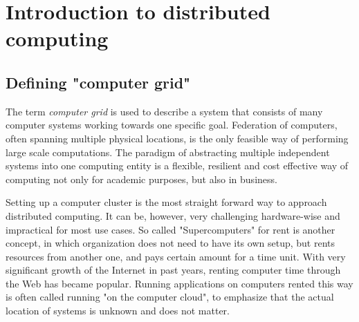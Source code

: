 \chapter{Introduction to distributed computing}

\section{Defining "computer grid"}

\begin{comment}

roadmap:
https://workflowy.com/shared/a2a23b89-e51f-4f48-4fb9-dd4d9194998f/

wprowadzenie

paradigm shift: kiedyś komputery jako wielkie systemy bez interaktywnego dostępu, wykonywanie zadan, długi czas oczekiwania na zadanie
później rewolucja "personal computers", (xerox, apple, ibm, ibm compatible) - interaktywny dostęp, każdy mógł wykonywać swoje obliczenia
teraz obserwujemy kolejną rewolucję (? czy nie nadzbyt dalekoidące wnisoki?) - computer grids, cloud computing, volunteer computing, microsoft xbox one cloud computing for games

co to jest grid, co to jest cloud, co to jest volunteer computing

przykłady już tutaj czy dalej?

"Na jej podstawie została stworzona siec Arpanet, z której wyewoluował ´
Internet, globalna siec komputerowa. Jej powstanie stworzyło nowe mo ´ zliwo ˙ sci ´
przesyłania danych do komputerów, do których uzytkownik nie ma bezpo ˙ srednie- ´
go dost˛epu. Wczesniej przetwarzanie danych było zamkni˛ete w obr˛ebie jedn ´ ego
osrodka."

\end{comment}

The term \emph{computer grid} is used to describe a system that consists of many computer systems working towards one specific goal. Federation of computers, often spanning multiple physical locations, is the only feasible way of performing large scale computations. The paradigm of abstracting multiple independent systems into one computing entity is a flexible, resilient and cost effective way of computing not only for academic purposes, but also in business.

Setting up a computer cluster is the most straight forward way to approach distributed computing. It can be, however, very challenging hardware-wise and impractical for most use cases. So called "Supercomputers" for rent is another concept, in which organization does not need to have its own setup, but rents resources from another one, and pays certain amount for a time unit. With very significant growth of the Internet in past years, renting computer time through the Web has became popular. Running applications on computers rented this way is often called running "on the computer cloud", to emphasize that the actual location of systems is unknown and does not matter.

